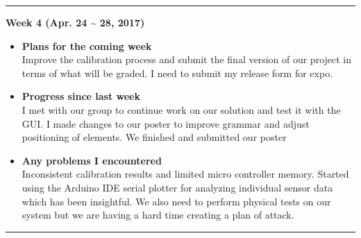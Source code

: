 	\rule{\textwidth}{0.5pt}

	\begin{center}
		\textbf{Week 4 (Apr. 24 {\textasciitilde{}} 28, 2017)}
	\end{center}
	\begin{itemize}
		\item \textbf{Plans for the coming week}
		\\ Improve the calibration process and submit the final version of our project in terms of what will be graded. I need to submit my release form for expo.\\

		\item \textbf{Progress since last week}
		\\I met with our group to continue work on our solution and test it with the GUI. I made changes to our poster to improve grammar and adjust positioning of elements. We finished and submitted our poster\\

		\item \textbf{Any problems I encountered}
		\\Inconsistent calibration results and limited micro controller memory. Started using the Arduino IDE serial plotter for analyzing individual sensor data which has been insightful. We also need to perform physical tests on our system but we are having a hard time creating a plan of attack.\\
	\end{itemize}

	\rule{\textwidth}{0.5pt}

